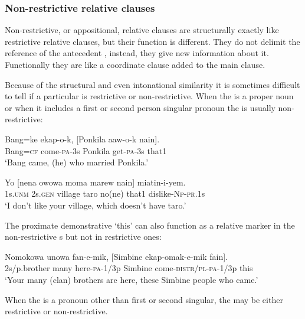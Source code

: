 \subsubsection{Non-restrictive relative clauses} \label{sec:8.3.1.4}

Non-restrictive, or appositional, relative clauses are structurally exactly like restrictive relative clauses, but their function is different. They do not delimit the reference of the antecedent , instead, they give new information about it. Functionally they are like a coordinate clause added to the main clause.

Because of the structural and even intonational similarity it is sometimes difficult to tell if a particular  is restrictive or non-restrictive. When the  is a proper noun or when it includes a first or second person singular pronoun the  is usually non-restrictive:

\ea%
\label{ex:8:x1567}
\gll Bang=ke  ekap-o-k,  [Ponkila  aaw-o-k  nain].\\
Bang=\textsc{cf} come-\textsc{pa}-3s Ponkila get-\textsc{pa}-3s  that1\\
\glt`Bang came, (he) who married Ponkila.'
\z


\ea%
\label{ex:8:x1568}
\gll Yo  [nena  owowa  moma  marew  nain]  miatin-i-yem. \\
1s.\textsc{unm} 2s.\textsc{gen} village  taro  no(ne)  that1 dislike-\textsc{Np}-\textsc{pr}.1s\\
\glt`I don't like your village, which doesn't have taro.'
\z


The proximate demonstrative  `this' can also function as a relative marker in the non-restrictive s but not in restrictive ones:

\ea%
\label{ex:8:x1536}
\gll Nomokowa  unowa  fan-e-mik,  [Simbine ekap-omak-e-mik  fain].\\
2s/p.brother  many  here-\textsc{pa}-1/3p Simbine come-\textsc{distr}/\textsc{pl}-\textsc{pa}-1/3p this\\
\glt`Your many (clan) brothers are here, these Simbine people who came.'
\z


When the  is a pronoun other than first or second singular, the  may be either restrictive or non-restrictive.

